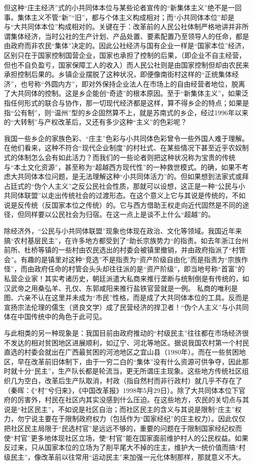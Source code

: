 \documentclass[a4paper,12pt,punct=kaiming,fontset=none]{ctexart}
\begin{document}
但这种“庄主经济”式的小共同体本位与某些论者宣传的“新集体主义”绝不是一回事。集体主义不管“新”“旧”，都与个体主义构成相对；而“小共同体本位”却是与“大共同体本位”构成相对的。关键在于：改革前的人民公社体制严格地讲并非所谓集体经济，当时公社的生产计划、产品处置、要素配置乃至领导人的任命，都是由政府而非农民“集体”决定的。因此公社经济与国有企业一样是“国家本位”经济，区别只在于国家控制国营企业，国家也承担了控制的后果，（即企业不自主经营，但也不自负盈亏，国家保障工人的收入）而人民公社则是由国家控制但却由农民来承担控制后果的。乡镇企业摆脱了这种状况，即便像南街村这样的“正统集体经济”，也号称“外圆内方”，即对外保持企业法人在市场上的自由经营者地位，脱离了大共同体的控制。这是乡企能创“奇迹”的根本原因。至于“新集体主义”，如果泛指任何形式的联合与协作，那一切现代经济都是这样，算不得乡企的特点；如果是指“公有制”，则“温州”型的乡企固然算不上，就是苏南式的乡企，经过1996年以来的“大转制”与产权改革后，又还有多少这种“主义”的色彩呢？

我国一些乡企的家族色彩、“庄主”色彩与小共同体色彩曾令一些外国人难于理解。在他们看来，这种不符合“现代企业制度”的村社式、在某些情况下甚至近乎农奴制式的体制怎么会有如此活力？而我们的一些论者则把这种状况称为宝贵的传统与“本土文化资源”，甚至称为“超越西方现代性”的一种救世模式。的确，如果不考虑大共同体本位问题，是无法理解这种“小共同体活力”的。但如果想到法家式或拜占廷式的“伪个人主义”之反公民社会性质，那就可以设想，这正是一种“公民与小共同体联盟”以走出传统社会的过渡形态。在这个意义上它与其说是传统的，不如说是反传统（反国家本位之传统）的。它与西方借助王权走向近代固然是不同的途径，但同样要以公民社会为归宿。在这一点上是谈不上什么“超越”的。

除经济外，“公民与小共同体联盟”现象也体现在政治、文化等领域。我国近年来搞“农村基层民主”，在许多地方都受到了“助长宗族势力“的指责。如去年浙江台州前所、杜桥等镇的一些村由农民选出的村委会被镇里撤销，并由政府指派了“村管会”。有趣的是镇里对这种“竞选”不是指责为“资产阶级自由化”而是指责为“宗族作怪”，而由政府任命的村管会头头却往往派的是“资产阶级”，即当地号称“首富”的私营企业家！其实考诸历史，朝廷派遣大私商来推行垄断与统制倒是有传统的，如汉武帝之用桑弘羊、孔仅、东郭咸阳来推行盐铁官营就是一例。 私商的唯利是图、六亲不认在这里并未成为“市民”性格，而是成了大共同体本位的工具。反而是宣扬宗法伦理的儒生（贤良文学）成了民营经济的捍卫者！“伪个人主义”与小共同体在中国传统中的角色于此可见。

与此相类的另一种现象是：我国目前由政府推动的“村级民主”往往都在市场经济很不发达的相对贫困地区进展顺利，如辽宁、河北等地区。据说我国农村第一个村民直选的村委会就出在广西最贫困的河池地区之宜山县（1980年）。而在一些贫困地区，早在改革前旧体制下，由于一穷二白的“集体”没有什么资源可供争夺，因此那时就十分“民主”，生产队长都是轮流当，更无所谓庄主现象。这些地方传统社区组织几为空白，改革后生产队取消，村政（指自然村而非行政村）就几乎不存在了（秦晖：《“村”兮归来》，《中国改革报》1998年5月29日）。除了大共同体本位下官府的厉害外，村民在社区内其实没感到什么压迫。在这些地方，农民的关切点与其说是“社区民主”，不如说是社区自治；而社区民主的含义与其说是限制“庄主”权力，勿宁说主要在于限制政府权力（包括作为“国家经纪”的庄主权力）。因此仅仅把社区民主局限于“民选村官”是远远不够的，重要的问题在于限制国家经纪权而使“村官”更多地体现社区立场，使“村官”能在国家面前维护村人的公民权益。如果反过来，只从国家本位的立场为了削平尾大不掉的庄主，维护大一统价值而搞“村级民主”，像改革前以往常用“运动民主”来加强一元化体制那样，那就意义不大。
\end{document}

